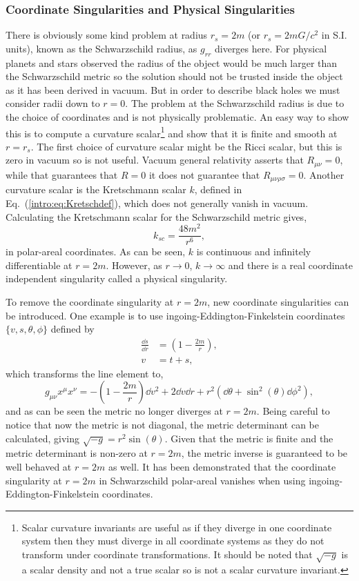 \subsubsection{Coordinate Singularities and Physical Singularities}
There is obviously some kind problem at radius $r_s=2m$ (or $r_s=2mG/c^2$ in S.I. units), known as the Schwarzschild radius, as $g_{rr}$ diverges here. For physical planets and stars observed the radius of the object would be much larger than the Schwarzschild metric so the solution should not be trusted inside the object as it has been derived in vacuum. But in order to describe black holes we must consider radii down to $r=0$. The problem at the Schwarzschild radius is due to the choice of coordinates and is not physically problematic. An easy way to show this is to compute a curvature scalar\footnote{Scalar curvature invariants are useful as if they diverge in one coordinate system then they must diverge in all coordinate systems as they do not transform under coordinate transformations. It should be noted that $\sqrt{-g}$ is a scalar density and not a true scalar so is not a scalar curvature invariant.} and show that it is finite and smooth at $r=r_s$. The first choice of curvature scalar might be the Ricci scalar, but this is zero in vacuum so is not useful. Vacuum general relativity asserts that $R_{\mu\nu}=0$, while that guarantees that $R=0$ it does not guarantee that $R_{\mu\nu\rho\sigma}=0$. Another curvature scalar is the Kretschmann scalar $k$, defined in Eq.~(\ref{intro:eq:Kretschdef}), which does not generally vanish in vacuum. Calculating the Kretschmann scalar for the Schwarzschild metric gives,
\begin{equation}
k_{sc} = \frac{48 m^2}{r^6}, \label{intro:eq:Kretsch}
\end{equation} 
in polar-areal coordinates. As can be seen, $k$ is continuous and infinitely differentiable at $r=2m$. However, as $r\rightarrow0$, $k\rightarrow \infty$ and there is a real coordinate independent singularity called a physical singularity. 

To remove the coordinate singularity at $r=2m$, new coordinate singularities can be introduced. One example is to use ingoing-Eddington-Finkelstein coordinates $\{ v,s,\theta,\phi \}$ defined by
\begin{align}
\frac{\dd s}{\dd r} &= \left(1-\frac{2m}{r}\right), \\
v &= t + s,
\end{align} 
which transforms the line element to, 
\begin{equation}
g_{\mu\nu}x^\mu x^\nu = -\left( 1-\frac{2m}{r}\right) \dd v^2 + 2 \dd v \dd r + r^2 \left(\dd \theta + \sin^2(\theta) \dd \phi^2\right),
\end{equation}
and as can be seen the metric no longer diverges at $r=2m$. Being careful to notice that now the metric is not diagonal, the metric determinant can be calculated, giving $\sqrt{-g} = r^2 \sin(\theta)$. Given that the metric is finite and the metric determinant is non-zero at $r=2m$, the metric inverse is guaranteed to be well behaved at $r=2m$ as well. It has been demonstrated that the coordinate singularity at $r=2m$ in Schwarzschild polar-areal vanishes when using ingoing-Eddington-Finkelstein coordinates.


